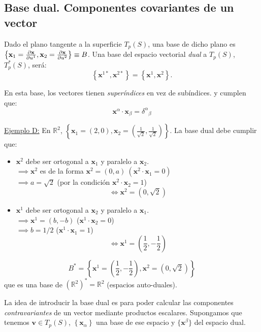 \subsection{Base dual. Componentes covariantes de un vector}
Dado el plano tangente a la superficie $T_p(S)$, una base de dicho plano es $\left \{ \mathbf{x}_1=\pdv{\mathbf{x}}{u^1},\mathbf{x}_2=\pdv{\mathbf{x}}{u^2} \right \}\equiv B$. Una base del espacio vectorial \emph{dual} a $T_p(S)$, $T_p^*(S)$, será:
$$
\left \{ \mathbf{x}^{1*},\mathbf{x}^{2*} \right \}=\left \{ \mathbf{x}^1,\mathbf{x}^2 \right \}.
$$

En esta base, los vectores tienen \emph{superíndices} en vez de subíndices. y cumplen que:
$$
\mathbf{x}^\alpha \cdot \mathbf{x}_\beta =\delta ^\alpha {}_\beta 
$$

\begin{mybox}
    \underline{Ejemplo D:} En $\mathbb{R}^2$, $\left \{ \mathbf{x}_1=(2,0),\mathbf{x}_2=\left ( \frac{1}{\sqrt{2}},\frac{1}{\sqrt{2}} \right ) \right \}$. La base dual debe cumplir que:
    \begin{itemize}
        \item $\mathbf{x}^2$ debe ser ortogonal a $\mathbf{x}_1$ y paralelo a $\mathbf{x}_2$.\\
        $\implies \mathbf{x}^2$ es de la forma $\mathbf{x}^2=(0,a) \ (\mathbf{x}^2\cdot \mathbf{x}_1=0)$\\
        $\implies a=\sqrt{2}$ (por la condición $\mathbf{x}^2\cdot \mathbf{x}_2=1$)
        $$
        \iff \mathbf{x}^2=\left (0,\sqrt{2} \right )
        $$

        \item $\mathbf{x}^1$ debe ser ortogonal a $\mathbf{x}_2$ y paralelo a $\mathbf{x}_1$.\\
        $\implies \mathbf{x}^1=(b,-b)$ ($\mathbf{x}^1\cdot \mathbf{x}_2=0$)\\
        $\implies b=1/2$ ($\mathbf{x}^1\cdot \mathbf{x}_1=1$)
        $$
        \iff \mathbf{x}^1=\left ( \frac{1}{2},-\frac{1}{2} \right )
        $$
    \end{itemize}
    $$
    B^*=\left \{ \mathbf{x}^1=\left ( \frac{1}{2},-\frac{1}{2} \right ),\mathbf{x}^2=\left (0,\sqrt{2} \right ) \right \}
    $$
    que es una base de $\left (\mathbb{R}^2\right )^*=\mathbb{R}^2$ (espacios auto-duales).
\end{mybox}
La idea de introducir la base dual es para poder calcular las componentes \emph{contravariantes} de un vector mediante productos escalares. Supongamos que tenemos $\mathbf{v}\in T_p(S)$, $\left \{ \mathbf{x}_\alpha \right \}$ una base de ese espacio y $\{ \mathbf{x}^\beta  \}$ del espacio dual.
